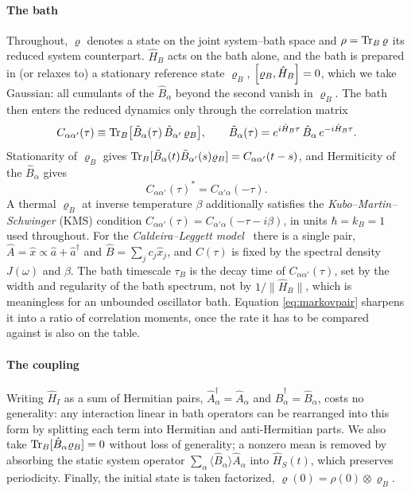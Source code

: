 \documentclass[a4paper,11pt]{article}
\begin{document}
\paragraph{The bath}
Throughout, $\varrho$ denotes a state on the joint system--bath space and $\rho = \Tr_B\varrho$ its reduced system counterpart.
$\hat H_B$ acts on the bath alone, and the bath is prepared in (or relaxes to) a stationary reference state $\varrho_B$, $\comm{\varrho_B}{\hat H_B} = 0$, which we take Gaussian: all cumulants of the $\hat B_\alpha$ beyond the second vanish in $\varrho_B$.
The bath then enters the reduced dynamics only through the correlation matrix
\begin{equation}\label{eq:corrmat}
  C_{\alpha\alpha'}(\tau) \equiv \Tr_B\!\big[\tilde B_\alpha(\tau)\,\hat B_{\alpha'}\,\varrho_B\big],
  \qquad
  \tilde B_\alpha(\tau) = e^{i\hat H_B\tau}\,\hat B_\alpha\, e^{-i\hat H_B\tau}.
\end{equation}
Stationarity of $\varrho_B$ gives $\Tr_B[\tilde B_\alpha(t)\tilde B_{\alpha'}(s)\varrho_B] = C_{\alpha\alpha'}(t-s)$, and Hermiticity of the $\hat B_\alpha$ gives
\begin{equation}\label{eq:corrsym}
  C_{\alpha\alpha'}(\tau)^* = C_{\alpha'\alpha}(-\tau).
\end{equation}
A thermal $\varrho_B$ at inverse temperature $\beta$ additionally satisfies the \emph{Kubo–Martin–Schwinger} (KMS) condition $C_{\alpha\alpha'}(\tau) = C_{\alpha'\alpha}(-\tau - i\beta)$, in units $\hbar = k_B = 1$ used throughout. For the \emph{Caldeira--Leggett model}~\cite{CaldeiraLeggett1983} there is a single pair, $\hat A = \hat x \propto \hat a + \hat a^\dagger$ and $\hat B = \sum_j c_j \hat x_j$, and $C(\tau)$ is fixed by the spectral density $J(\omega)$ and $\beta$. The bath timescale $\tau_B$ is the decay time of $C_{\alpha\alpha'}(\tau)$, set by the width and regularity of the bath spectrum, not by $1/\lVert \hat H_B\rVert$, which is meaningless for an unbounded oscillator bath. Equation \eqref{eq:markovpair} sharpens it into a ratio of correlation moments, once the rate it has to be compared against is also on the table.

\paragraph{The coupling}
Writing $\hat H_I$ as a sum of Hermitian pairs, $\hat A_\alpha^\dagger = \hat A_\alpha$ and $\hat B_\alpha^\dagger = \hat B_\alpha$, costs no generality: any interaction linear in bath operators can be rearranged into this form by splitting each term into Hermitian and anti-Hermitian parts. We also take $\Tr_B[\hat B_\alpha\varrho_B] = 0$ without loss of generality; a nonzero mean is removed by absorbing the static system operator $\sum_\alpha \langle\hat B_\alpha\rangle\hat A_\alpha$ into $\hat H_S(t)$, which preserves periodicity. Finally, the initial state is taken factorized, $\varrho(0) = \rho(0)\otimes\varrho_B$.
\end{document}
